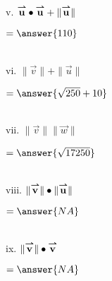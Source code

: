 \documentclass{ximera}
\begin{document}
\begin{exercise}
v. $\vec{u}\dotp \vec{u} + \|\vec{u}\|$ \begin{prompt} $= \answer{110}$\end{prompt}\\

vi. $\|\vec{v}\| + \|\vec{u}\|$ \begin{prompt} $= \answer{\sqrt{250} + 10}$\end{prompt}\\

vii. $\|\vec{v}\| \|\vec{w}\|$ \begin{prompt} $ = \answer{\sqrt{17250}}$\end{prompt}\\

viii. $\|\vec{v}\|\dotp \|\vec{u}\|$ \begin{prompt} $= \answer{NA}$\end{prompt} \\

ix. $\|\vec{v}\|\dotp \vec{v}$ \begin{prompt} $= \answer{NA} $\end{prompt}




















\end{exercise}
\end{document}
